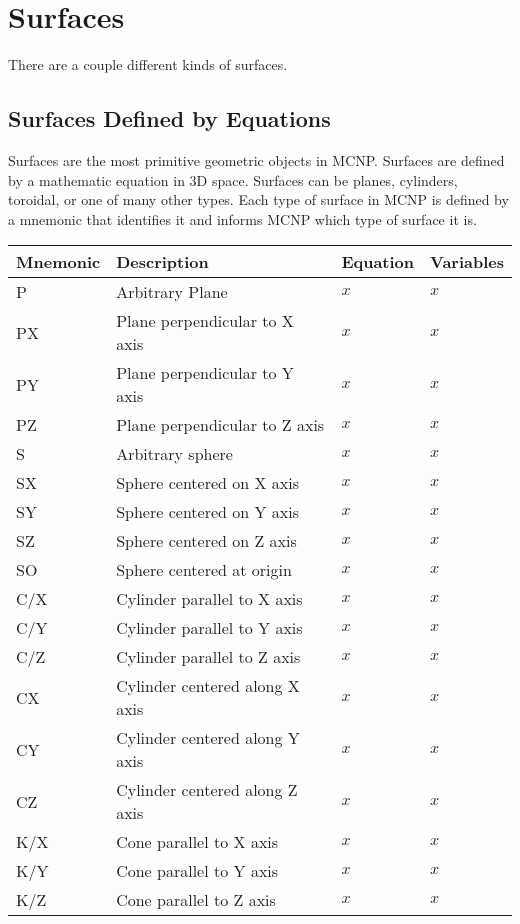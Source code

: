 \documentclass[10pt,a4paper]{book}
\begin{document}
\chapter{Surfaces}
There are a couple different kinds of surfaces.

\section{Surfaces Defined by Equations}

Surfaces are the most primitive geometric objects in MCNP. Surfaces are defined by a mathematic equation in 3D space. Surfaces can be planes, cylinders, toroidal, or one of many other types. Each type of surface in MCNP is defined by a mnemonic that identifies it and informs MCNP which type of surface it is.

\begin{tabular}{ |l|l|l|l| }
  \hline
  Mnemonic & Description & Equation & Variables  \\ \hline 
  P & Arbitrary Plane & $x$ & $x$ \\
  PX & Plane perpendicular to X axis & $x$ & $x$ \\
  PY & Plane perpendicular to Y axis & $x$ & $x$ \\
  PZ & Plane perpendicular to Z axis & $x$ & $x$ \\ \hline 
  S  & Arbitrary sphere & $x$ & $x$ \\
  SX  & Sphere centered on X axis & $x$ & $x$ \\
  SY  & Sphere centered on Y axis & $x$ & $x$ \\
  SZ  & Sphere centered on Z axis & $x$ & $x$ \\
  SO  & Sphere centered at origin & $x$ & $x$ \\ \hline
  C/X & Cylinder parallel to X axis & $x$ & $x$ \\
  C/Y & Cylinder parallel to Y axis & $x$ & $x$ \\
  C/Z & Cylinder parallel to Z axis & $x$ & $x$ \\
  CX & Cylinder centered along X axis & $x$ & $x$ \\
  CY & Cylinder centered along Y axis & $x$ & $x$ \\
  CZ & Cylinder centered along Z axis & $x$ & $x$ \\ \hline
  K/X & Cone parallel to X axis & $x$ & $x$ \\
  K/Y & Cone parallel to Y axis & $x$ & $x$ \\
  K/Z & Cone parallel to Z axis & $x$ & $x$ \\

\end{tabular}
\end{document}
